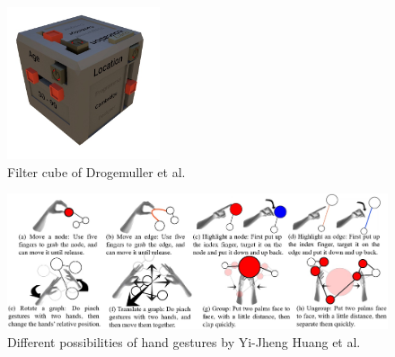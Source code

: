 \begin{figure}[h]
    \centering
    \includegraphics[width=0.4\textwidth]{graphics/filterCube.jpg}
    \caption{Filter cube of Drogemuller et al. \cite{drogemuller_vrige_2017}} 
    \label{fig:vrFilterCube} 
\end{figure}

\begin{figure}[h]
    \centering
    \includegraphics[width=1\textwidth]{graphics/handGestures.jpg}
    \caption{Different possibilities of hand gestures by Yi-Jheng Huang et al. \cite{yi-jheng_huang_gesture_2017}} 
    \label{fig:vrHandGestures} 
\end{figure}